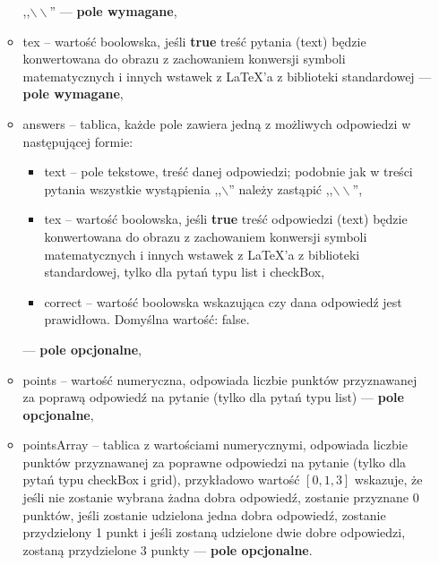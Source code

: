 \begin{itemize}
\begin{itemize}
    ,,$\backslash\backslash$'' --- \textbf{pole wymagane},
    \item{tex} -- wartość boolowska, jeśli \textbf{true} treść pytania (text) będzie
    konwertowana do obrazu z zachowaniem konwersji symboli matematycznych i innych
    wstawek z \LaTeX{}'a z biblioteki standardowej --- \textbf{pole wymagane},
    \item{answers} -- tablica, każde pole zawiera jedną z możliwych odpowiedzi w
    następującej formie:
    \begin{itemize}
      \item text -- pole tekstowe, treść danej odpowiedzi; podobnie jak w treści
        pytania wszystkie wystąpienia ,,$\backslash$'' należy zastąpić 
        ,,$\backslash\backslash$'',
      \item tex -- wartość boolowska, jeśli \textbf{true} treść odpowiedzi (text) będzie
      konwertowana do obrazu z zachowaniem konwersji symboli matematycznych i innych
      wstawek z \LaTeX{}'a z biblioteki standardowej, tylko dla pytań typu list i checkBox,
      \item correct -- wartość boolowska wskazująca czy dana odpowiedź jest prawidłowa.
      Domyślna wartość: false.
    \end{itemize} 
    --- \textbf{pole opcjonalne},
    \item{points} -- wartość numeryczna, odpowiada liczbie punktów przyznawanej za
    poprawą odpowiedź na pytanie (tylko dla pytań typu list)
    --- \textbf{pole opcjonalne},
    \item{pointsArray} -- tablica z wartościami numerycznymi, odpowiada liczbie punktów
    przyznawanej za poprawne odpowiedzi na pytanie (tylko dla pytań typu checkBox i grid),
    przykładowo wartość $ [0, 1, 3] $ wskazuje, że jeśli nie zostanie wybrana żadna dobra
    odpowiedź, zostanie przyznane 0 punktów, jeśli zostanie udzielona jedna dobra odpowiedź,
    zostanie przydzielony 1 punkt i jeśli zostaną udzielone dwie dobre odpowiedzi, zostaną
    przydzielone 3 punkty
    --- \textbf{pole opcjonalne}.
  \end{itemize}
\end{itemize}

